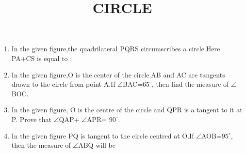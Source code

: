 \documentclass[12pt,A4 paper]{article}
\begin{document}
\title{\textbf{CIRCLE}}
\date{}
\maketitle
\begin{flushleft}
\begin{enumerate}
\item In the given figure,the quadrilateral PQRS circumscribes a circle.Here PA+CS is equal to : \\

\begin{figure}[h]
	        \centering
	        
 \end{figure}


 \begin{figure}[h]
	        \centering
	        
 \end{figure}




\item In the given figure,O is the center of the circle.AB and AC are tangents drawn to the circle from point A.If $\angle$BAC=$65^{\circ}$, then find the measure of $\angle$BOC.\\


	\begin{center}
\begin{figure}[h]
	        \centering
	        
        \end{figure}
	\end{center}


\pagebreak

\item In the given figure, O is the centre of the circle and QPR is a tangent to it at P. Prove that $\angle$QAP+ $\angle$APR= $90^{\circ}$.\\
\begin{figure}[h]
	        \centering
	        
        \end{figure}


\item In the given figure PQ is tangent to the circle centred at O.If $\angle$AOB=$95^{\circ}$, then the measure of $\angle$ABQ will be


\begin{figure}[h]
	        \centering
	        
        \end{figure}


\begin{figure}[h]
	        \centering
	        
        \end{figure}



\end{enumerate}
\end{flushleft}
\end{document}

